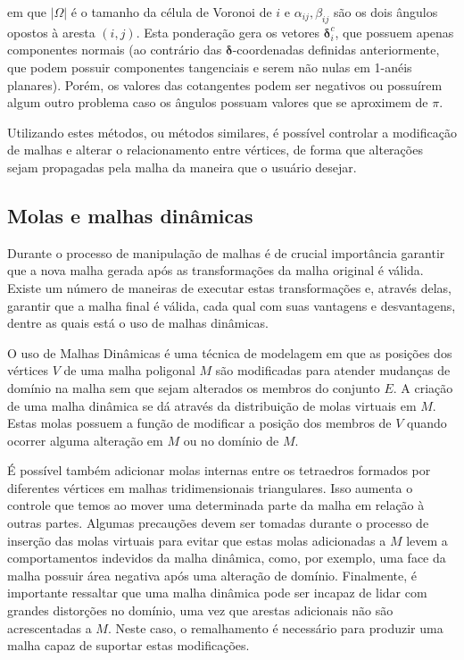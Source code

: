 \noindent em que $|\Omega|$ é o tamanho da célula de Voronoi de $i$ e $\alpha_{ij}, \beta_{ij}$ são os dois ângulos opostos à aresta $(i, j)$. Esta ponderação gera os vetores $\mathbf{\delta}_i^c$, que possuem apenas componentes normais (ao contrário das $\mathbf{\delta}$-coordenadas definidas anteriormente, que podem possuir componentes tangenciais e serem não nulas em 1-anéis planares). Porém, os valores das cotangentes podem ser negativos ou possuírem algum outro problema caso os ângulos possuam valores que se aproximem de $\pi$.

Utilizando estes métodos, ou métodos similares, é possível controlar a modificação de malhas e alterar o relacionamento entre vértices, de forma que alterações sejam propagadas pela malha da maneira que o usuário desejar.

\subsection{Molas e malhas dinâmicas}
\label{MD}
Durante o processo de manipulação de malhas é de crucial importância garantir que a nova malha gerada após as transformações da malha original é válida. Existe um número de maneiras de executar estas transformações e, através delas, garantir que a malha final é válida, cada qual com suas vantagens e desvantagens, dentre as quais está o uso de malhas dinâmicas.

\begin{defi}
    O uso de Malhas Dinâmicas é uma técnica de modelagem em que as posições dos vértices $V$ de uma malha poligonal $M$ são modificadas para atender mudanças de domínio na malha sem que sejam alterados os membros do conjunto $E$. A criação de uma malha dinâmica se dá através da distribuição de molas virtuais em $M$. Estas molas possuem a função de modificar a posição dos membros de $V$ quando ocorrer alguma alteração em $M$ ou no domínio de $M$.\cite{soares2007}
\end{defi}

É possível também adicionar molas internas entre os tetraedros formados por diferentes vértices em malhas tridimensionais triangulares\cite{soares2007}. 
Isso aumenta o controle que temos ao mover uma determinada parte da malha em relação à outras partes.
Algumas precauções devem ser tomadas durante o processo de inserção das molas virtuais para evitar que estas molas adicionadas a $M$ levem a comportamentos indevidos da malha dinâmica, como, por exemplo, uma face da malha possuir área negativa após uma alteração de domínio. Finalmente, é importante ressaltar que uma malha dinâmica pode ser incapaz de lidar com grandes distorções no domínio, uma vez que arestas adicionais não são acrescentadas a $M$. Neste caso, o remalhamento é necessário para produzir uma malha capaz de suportar estas modificações.

